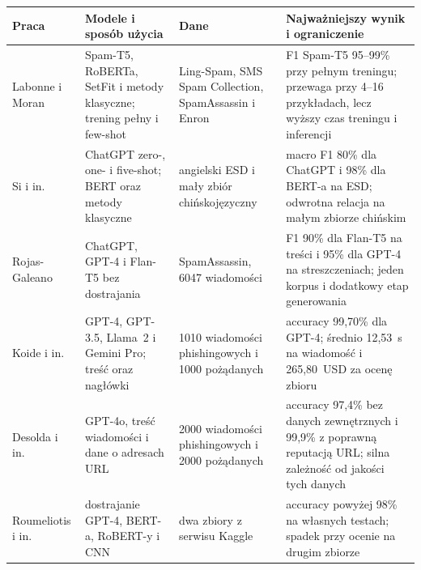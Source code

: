 \begin{tabular}{p{}p{}p{}p{}}
\hline
\textbf{Praca} & \textbf{Modele i sposób użycia} & \textbf{Dane} & \textbf{Najważniejszy wynik i ograniczenie} \\
\hline
Labonne i Moran~\autocite{labonne-spam-t5-2023} & Spam-T5, RoBERTa, SetFit i metody klasyczne; trening pełny i few-shot & Ling-Spam, SMS Spam Collection, SpamAssassin i Enron & F1 Spam-T5 95--99\% przy pełnym treningu; przewaga przy 4--16 przykładach, lecz wyższy czas treningu i inferencji \\
Si i in.~\autocite{si-chatgpt-spam-2024} & ChatGPT zero-, one- i five-shot; BERT oraz metody klasyczne & angielski ESD i mały zbiór chińskojęzyczny & macro F1 80\% dla ChatGPT i 98\% dla BERT-a na ESD; odwrotna relacja na małym zbiorze chińskim \\
Rojas-Galeano~\autocite{rojas-galeano-zero-shot-spam-2024} & ChatGPT, GPT-4 i Flan-T5 bez dostrajania & SpamAssassin, 6047 wiadomości & F1 90\% dla Flan-T5 na treści i 95\% dla GPT-4 na streszczeniach; jeden korpus i dodatkowy etap generowania \\
Koide i in.~\autocite{koide-chatspamdetector-2024} & GPT-4, GPT-3.5, Llama~2 i Gemini Pro; treść oraz nagłówki & 1010 wiadomości phishingowych i 1000 pożądanych & accuracy 99,70\% dla GPT-4; średnio 12,53~s na wiadomość i 265,80~USD za ocenę zbioru \\
Desolda i in.~\autocite{desolda-apollo-2025} & GPT-4o, treść wiadomości i dane o adresach URL & 2000 wiadomości phishingowych i 2000 pożądanych & accuracy 97,4\% bez danych zewnętrznych i 99,9\% z poprawną reputacją URL; silna zależność od jakości tych danych \\
Roumeliotis i in.~\autocite{roumeliotis-next-generation-spam-2024} & dostrajanie GPT-4, BERT-a, RoBERT-y i CNN & dwa zbiory z serwisu Kaggle & accuracy powyżej 98\% na własnych testach; spadek przy ocenie na drugim zbiorze \\
\hline
\end{tabular}
